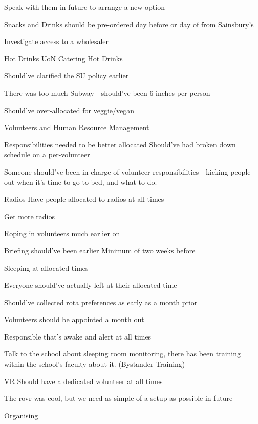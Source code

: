 \documentclass[11pt,hacksoc]{meetingmins}
\begin{document}
\begin{items}
		\subsubitem
		Speak with them in future to arrange a new option
		
	\subitem
	Snacks and Drinks should be pre-ordered day before or day of from Sainsbury's

	\subitem 
	Investigate access to a wholesaler
	
	\subitem
	Hot Drinks
		\subsubitem
		UoN Catering Hot Drinks
		
		\subitem
		Should've clarified the SU policy earlier
		
	\subitem
	There was too much Subway - should've been 6-inches per person
	
		\subsubitem
		Should've over-allocated for veggie/vegan
		
\item
Volunteers and Human Resource Management

	\subitem
	Responsibilities needed to be better allocated
		\subsubitem
		Should've had broken down schedule on a per-volunteer
		
		\subsubitem
		Someone should've been in charge of volunteer responsibilities - kicking people out when it's time to go to bed, and what to do.
		
	\subitem
	Radios
		\subsubitem
		Have people allocated to radios at all times
		
		\subsubitem
		Get more radios
		
		\subsubitem
		Roping in volunteers much earlier on
			
	\subitem
	Briefing should've been earlier
		\subsubitem
		Minimum of two weeks before
		
	\subitem
	Sleeping at allocated times
	
		\subsubitem
		Everyone should've actually left at their allocated time
		
	\subitem
	Should've collected rota preferences as early as a month prior
	
	\subitem
	Volunteers should be appointed a month out
	
	\subitem
	Responsible that's awake and alert at all times
	
	\subitem
	Talk to the school about sleeping room monitoring, there has been training within the school's faculty about it. (Bystander Training)
	
	\subitem
	VR Should have a dedicated volunteer at all times
	
		\subsubitem
		The rovr was cool, but we need as simple of a setup as possible in future
		
\item
Organising


\end{items}
\end{document}
